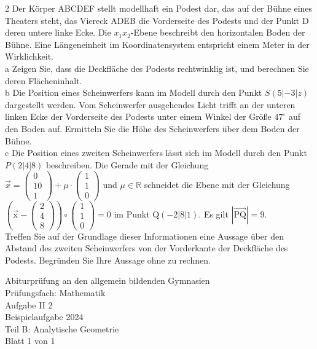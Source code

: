 \documentclass[10pt]{article}
\begin{document}
2 Der Körper ABCDEF stellt modellhaft ein Podest dar, das auf der Bühne eines Theaters steht, das Viereck ADEB die Vorderseite des Podests und der Punkt D deren untere linke Ecke. Die $x_{1} x_{2}$-Ebene beschreibt den horizontalen Boden der Bühne. Eine Längeneinheit im Koordinatensystem entspricht einem Meter in der Wirklichkeit.\\
a Zeigen Sie, dass die Deckfläche des Podests rechtwinklig ist, und berechnen Sie deren Flächeninhalt.\\
b Die Position eines Scheinwerfers kann im Modell durch den Punkt $S(5|-3| z)$ dargestellt werden. Vom Scheinwerfer ausgehendes Licht trifft an der unteren linken Ecke der Vorderseite des Podests unter einem Winkel der Größe $47^{\circ}$ auf den Boden auf. Ermitteln Sie die Höhe des Scheinwerfers über dem Boden der Bühne.\\
c Die Position eines zweiten Scheinwerfers lässt sich im Modell durch den Punkt $P(2|4| 8)$ beschreiben. Die Gerade mit der Gleichung\\
$\vec{x}=\left(\begin{array}{c}0 \\ 10 \\ 1\end{array}\right)+\mu \cdot\left(\begin{array}{l}1 \\ 1 \\ 0\end{array}\right)$ und $\mu \in \mathbb{R}$ schneidet die Ebene mit der Gleichung\\
$\left(\overrightarrow{\mathrm{x}}-\left(\begin{array}{l}2 \\ 4 \\ 8\end{array}\right)\right) \circ\left(\begin{array}{l}1 \\ 1 \\ 0\end{array}\right)=0$ im Punkt $\mathrm{Q}(-2|8| 1)$. Es gilt $|\overrightarrow{\mathrm{PQ}}|=9$.\\
Treffen Sie auf der Grundlage dieser Informationen eine Aussage über den Abstand des zweiten Scheinwerfers von der Vorderkante der Deckfläche des Podests. Begründen Sie Ihre Aussage ohne zu rechnen.

Abiturprüfung an den allgemein bildenden Gymnasien\\
Prüfungsfach: Mathematik\\
Aufgabe II 2\\
Beispielaufgabe 2024\\
Teil B: Analytische Geometrie\\
Blatt 1 von 1
\end{document}
